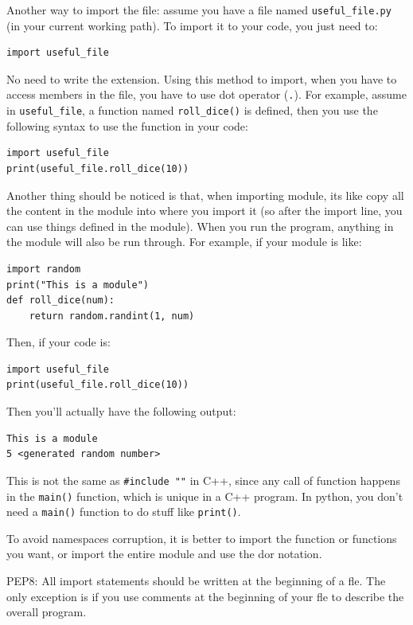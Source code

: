 \documentclass[12pt]{book}
\begin{document}
Another way to import the file: assume you have a file named \texttt{useful\_file.py} (in your current working path). To import it to your code, you just need to:
\begin{verbatim}
import useful_file
\end{verbatim}
No need to write the extension. Using this method to import, when you have to access members in the file, you have to use dot operator (\texttt{.}). For example, assume in \texttt{useful\_file}, a function named \texttt{roll\_dice()} is defined, then you use the following syntax to use the function in your code:
\begin{verbatim}
import useful_file
print(useful_file.roll_dice(10))
\end{verbatim}

Another thing should be noticed is that, when importing module, its like copy all the content in the module into where you import it (so after the import line, you can use things defined in the module). When you run the program, anything in the module will also be run through. For example, if your module is like:
\begin{verbatim}
import random
print("This is a module")
def roll_dice(num):
    return random.randint(1, num)
\end{verbatim}
Then, if your code is:
\begin{verbatim}
import useful_file
print(useful_file.roll_dice(10))
\end{verbatim}
Then you'll actually have the following output:
\begin{verbatim}
This is a module
5 <generated random number>
\end{verbatim}

This is not the same as \texttt{\#include ""} in C++, since any call of function happens in the \texttt{main()} function, which is unique in a C++ program. In python, you don't need a \texttt{main()} function to do stuff like \texttt{print()}.

To avoid namespaces corruption, it is better to import the function or functions you want, or import the entire module and use the dor notation.

PEP8: All import statements should be written at the beginning of a fle. The only exception is if you use comments at the beginning of your fle to describe the overall program.
\end{document}
